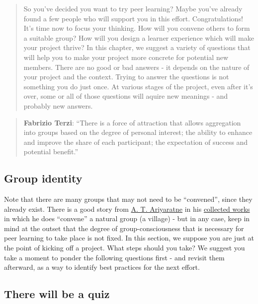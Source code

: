 \begin{quote}
So you've decided you want to try peer learning? Maybe you've already
found a few people who will support you in this effort. Congratulations!
It's time now to focus your thinking. How will you convene others to
form a suitable group? How will you design a learner experience which
will make your project thrive? In this chapter, we suggest a variety of
questions that will help you to make your project more concrete for
potential new members. There are no good or bad answers - it depends on
the nature of your project and the context. Trying to answer the
questions is not something you do just once. At various stages of the
project, even after it's over, some or all of those questions will
aquire new meanings - and probably new answers.
\end{quote}

\begin{quote}
\textbf{Fabrizio Terzi}: ``There is a force of attraction that allows
aggregation into groups based on the degree of personal interest; the
ability to enhance and improve the share of each participant; the
expectation of success and potential benefit.''
\end{quote}

\subsection{Group identity}\label{group-identity}

Note that there are many groups that may not need to be ``convened'',
since they already exist. There is a good story from
\href{http://www.sarvodayausa.org/learn/a-t-ariyartne/}{A. T.
Ariyaratne} in his
\href{http://www.sarvodaya.org/about/philosophy/collected-works-vol-1/rural-self-help}{collected
works} in which he does ``convene'' a natural group (a village) - but in
any case, keep in mind at the outset that the degree of
group-consciousness that is necessary for peer learning to take place is
not fixed. In this section, we suppose you are just at the point of
kicking off a project. What steps should you take? We suggest you take a
moment to ponder the following questions first - and revisit them
afterward, as a way to identify best practices for the next effort.

\subsection{There will be a quiz}\label{there-will-be-a-quiz}

